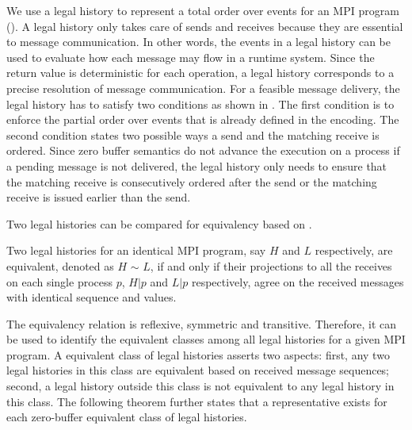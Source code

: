 We use a legal history to represent a total order over events for an MPI program (). A legal history only takes care of sends and receives because they are essential to message communication. In other words, the events in a legal history can be used to evaluate how each message may flow in a runtime system. Since the return value is deterministic for each operation, a legal history corresponds to a precise resolution of message communication. For a feasible message delivery, the legal history has to satisfy two conditions as shown in . The first condition is to enforce the partial order over events that is already defined in the encoding. The second condition states two possible ways a send and the matching receive is ordered. Since zero buffer semantics do not advance the execution on a process if a pending message is not delivered, the legal history only needs to ensure that the matching receive is consecutively ordered after the send or the matching receive is issued earlier than the send. 


Two legal histories can be compared for equivalency based on .  

\begin{definition}\label{def:er}
Two legal histories for an identical MPI program, say $H$ and $L$ respectively, are equivalent, denoted as $H$ $\sim$ $L$, if and only if their projections to all the receives on each single process $p$, $H | p$ and $L | p$ respectively, agree on the received messages with identical sequence and values.
\end{definition}

The equivalency relation is reflexive, symmetric and transitive. Therefore, it can be used to identify the equivalent classes among all legal histories for a given MPI program. A equivalent class of legal histories asserts two aspects: first, any two legal histories in this class are equivalent based on received message sequences; second, a legal history outside this class is not equivalent to any legal history in this class. The following theorem further states that a representative exists for each zero-buffer equivalent class of legal histories. 

